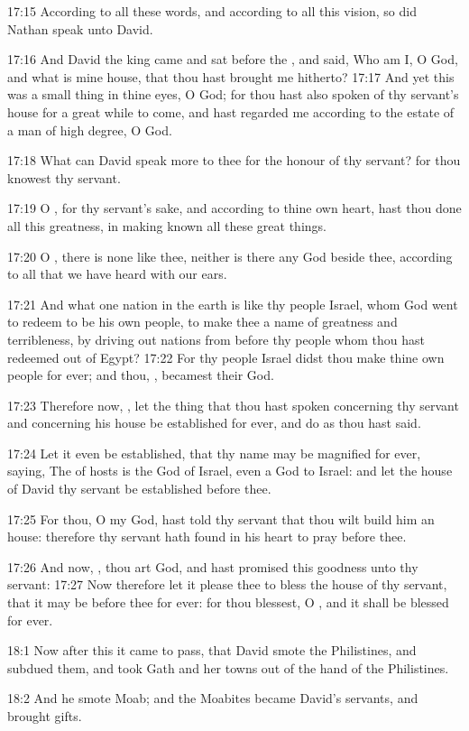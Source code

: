 17:15 According to all these words, and according to all this vision, so did Nathan speak unto David.

17:16 And David the king came and sat before the \LORD, and said, Who am I, O \LORD God, and what is mine house, that thou hast brought me hitherto?  17:17 And yet this was a small thing in thine eyes, O God; for thou hast also spoken of thy servant's house for a great while to come, and hast regarded me according to the estate of a man of high degree, O \LORD God.

17:18 What can David speak more to thee for the honour of thy servant?  for thou knowest thy servant.

17:19 O \LORD, for thy servant's sake, and according to thine own heart, hast thou done all this greatness, in making known all these great things.

17:20 O \LORD, there is none like thee, neither is there any God beside thee, according to all that we have heard with our ears.

17:21 And what one nation in the earth is like thy people Israel, whom God went to redeem to be his own people, to make thee a name of greatness and terribleness, by driving out nations from before thy people whom thou hast redeemed out of Egypt?  17:22 For thy people Israel didst thou make thine own people for ever; and thou, \LORD, becamest their God.

17:23 Therefore now, \LORD, let the thing that thou hast spoken concerning thy servant and concerning his house be established for ever, and do as thou hast said.

17:24 Let it even be established, that thy name may be magnified for ever, saying, The \LORD of hosts is the God of Israel, even a God to Israel: and let the house of David thy servant be established before thee.

17:25 For thou, O my God, hast told thy servant that thou wilt build him an house: therefore thy servant hath found in his heart to pray before thee.

17:26 And now, \LORD, thou art God, and hast promised this goodness unto thy servant: 17:27 Now therefore let it please thee to bless the house of thy servant, that it may be before thee for ever: for thou blessest, O \LORD, and it shall be blessed for ever.

18:1 Now after this it came to pass, that David smote the Philistines, and subdued them, and took Gath and her towns out of the hand of the Philistines.

18:2 And he smote Moab; and the Moabites became David's servants, and brought gifts.

